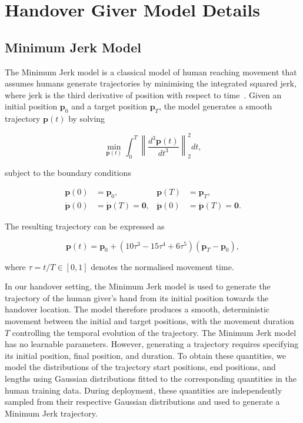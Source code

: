 \documentclass[journal]{IEEEtran}
\begin{document}
\section{Handover Giver Model Details}

\subsection{Minimum Jerk Model}

The Minimum Jerk model is a classical model of human reaching movement that assumes humans generate trajectories by minimising the integrated squared jerk, where jerk is the third derivative of position with respect to time~\cite{flash_CoordinationArmMovements_1985}. Given an initial position $\mathbf{p}_0$ and a target position $\mathbf{p}_T$, the model generates a smooth trajectory $\mathbf{p}(t)$ by solving

\begin{equation}
    \min_{\mathbf{p}(t)}
    \int_0^T
    \left\|
    \frac{d^3 \mathbf{p}(t)}{dt^3}
    \right\|_2^2
    dt,
\end{equation}

subject to the boundary conditions

\begin{equation}
\begin{aligned}
    \mathbf{p}(0) &= \mathbf{p}_0, &
    \mathbf{p}(T) &= \mathbf{p}_T, \\
    \dot{\mathbf{p}}(0) &= \dot{\mathbf{p}}(T) = \mathbf{0}, &
    \ddot{\mathbf{p}}(0) &= \ddot{\mathbf{p}}(T) = \mathbf{0}.
\end{aligned}
\end{equation}

The resulting trajectory can be expressed as

\begin{equation}
    \mathbf{p}(t)
    =
    \mathbf{p}_0
    +
    \left(
    10\tau^3
    -15\tau^4
    +6\tau^5
    \right)
    (\mathbf{p}_T-\mathbf{p}_0),
    \label{eq:min_jerk}
\end{equation}

where $\tau=t/T\in[0,1]$ denotes the normalised movement time.

In our handover setting, the Minimum Jerk model is used to generate the trajectory of the human giver's hand from its initial position towards the handover location. The model therefore produces a smooth, deterministic movement between the initial and target positions, with the movement duration $T$ controlling the temporal evolution of the trajectory. The Minimum Jerk model has no learnable parameters. However, generating a trajectory requires specifying its initial position, final position, and duration. To obtain these quantities, we model the distributions of the trajectory start positions, end positions, and lengths using Gaussian distributions fitted to the corresponding quantities in the human training data. During deployment, these quantities are independently sampled from their respective Gaussian distributions and used to generate a Minimum Jerk trajectory.
\end{document}
